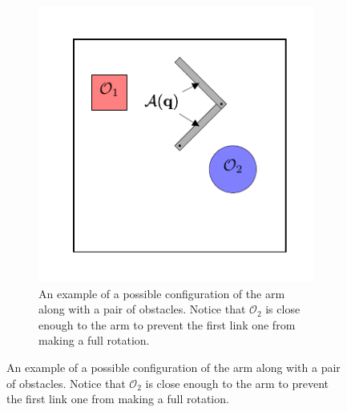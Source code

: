 \begin{figure}
\begin{center}
\begin{subfigure}[]{0.45\textwidth}
\begin{center}
        \includegraphics[]{planning/figs/arm_cspace/arm_world.pdf}
      \end{center}  
      \caption{An example of a possible configuration of the arm along
        with a pair of obstacles. Notice that $\mathcal{O}_2$ is close
        enough to the arm to prevent the first link one from making a
        full rotation.}
      \label{fig:arm_world}
    \end{subfigure}
    

\end{center}
\end{figure}
